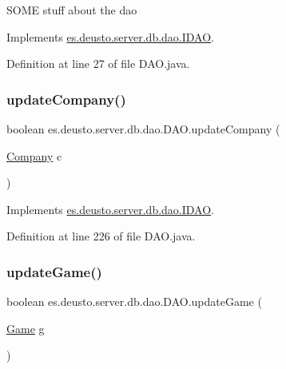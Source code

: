 S\+O\+ME stuff about the dao 

Implements \hyperlink{interfacees_1_1deusto_1_1server_1_1db_1_1dao_1_1_i_d_a_o_ab943216560f43595a852b406dcd394a4}{es.\+deusto.\+server.\+db.\+dao.\+I\+D\+AO}.



Definition at line 27 of file D\+A\+O.\+java.

\mbox{\label{classes_1_1deusto_1_1server_1_1db_1_1dao_1_1_d_a_o_a0748467c3346a5bcdcd79b508562b6dc}} 
\subsubsection{\texorpdfstring{update\+Company()}{updateCompany()}}
{\footnotesize\ttfamily boolean es.\+deusto.\+server.\+db.\+dao.\+D\+A\+O.\+update\+Company (\begin{DoxyParamCaption}\item[{\hyperlink{classes_1_1deusto_1_1server_1_1db_1_1data_1_1_company}{Company}}]{c }\end{DoxyParamCaption})}



Implements \hyperlink{interfacees_1_1deusto_1_1server_1_1db_1_1dao_1_1_i_d_a_o_a2d4302c61abd557f5a84d0698afdb814}{es.\+deusto.\+server.\+db.\+dao.\+I\+D\+AO}.



Definition at line 226 of file D\+A\+O.\+java.

\mbox{\label{classes_1_1deusto_1_1server_1_1db_1_1dao_1_1_d_a_o_ae7540010b43f96c5e50995a8376614e7}} 
\subsubsection{\texorpdfstring{update\+Game()}{updateGame()}}
{\footnotesize\ttfamily boolean es.\+deusto.\+server.\+db.\+dao.\+D\+A\+O.\+update\+Game (\begin{DoxyParamCaption}\item[{\hyperlink{classes_1_1deusto_1_1server_1_1db_1_1data_1_1_game}{Game}}]{g }\end{DoxyParamCaption})}



